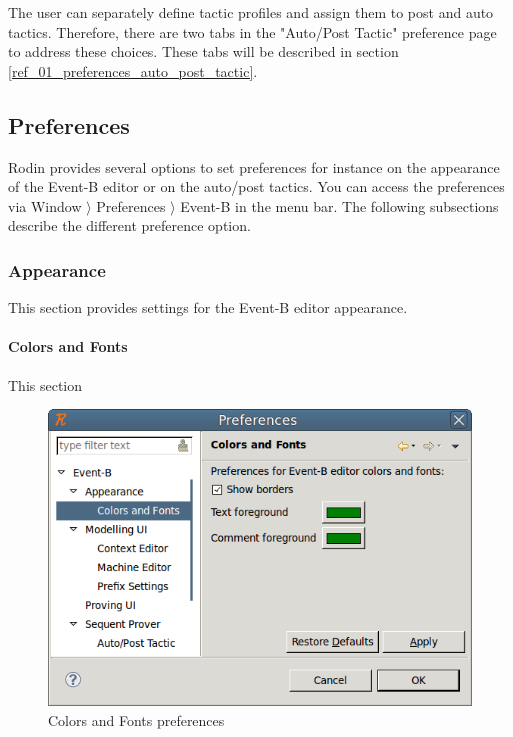 The user can separately define tactic profiles and assign them to post and auto tactics. Therefore, there are two tabs in the "Auto/Post Tactic" preference page to address these choices. These tabs will be described in section \ref{ref_01_preferences_auto_post_tactic}. 

\subsection{Preferences}

Rodin provides several options to set preferences for instance on the appearance of the Event-B editor or on the auto/post tactics. You can access the preferences via \textsf{Window $\rangle$ Preferences $\rangle$ Event-B} in the menu bar. The following subsections describe the different preference option.

\subsubsection{Appearance}

This section provides settings for the Event-B editor appearance.

\paragraph{Colors and Fonts}

This section

\begin{figure}[!h]
\begin{center}
	\includegraphics{img/reference/ref_01_preferences13.png}
	\caption{Colors and Fonts preferences}
	\label{fig_ref_01_preferences13}
\end{center}
\end{figure}

